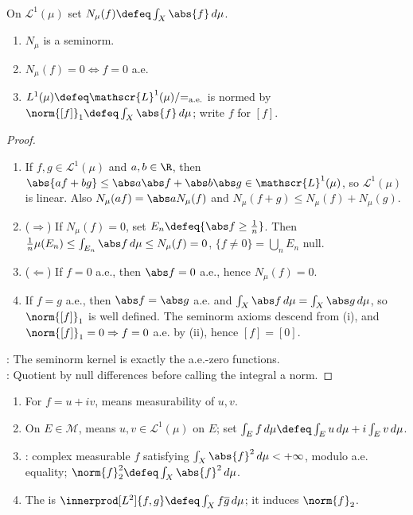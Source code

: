 \begin{proposition} \label{prop:l1-seminorm-and-ae-quotient} \\
On $\mathscr{L}^1(\mu)$ set $N_\mu(f)\defeq\int_X\abs{f}\,d\mu$.
\begin{enumerate}[label=(\roman*)]
\setlength{\itemsep}{0pt}
\item $N_\mu$ is a seminorm.
\item $N_\mu(f)=0\Longleftrightarrow f=0$ a.e.
\item $L^1(\mu)\defeq\mathscr{L}^1(\mu)/{=_{\mathrm{a.e.}}}$ is normed by $\norm{[f]}_1\defeq\int_X\abs{f}\,d\mu$; write $f$ for $[f]$.
\end{enumerate}
\begin{proof}
\begin{enumerate}[label=(\roman*)]
\setlength{\itemsep}{0pt}
\item[$(i)$] If $f,g\in\mathscr{L}^1(\mu)$ and $a,b\in\R$, then $\abs{af+bg}\leq\abs a\abs f+\abs b\abs g\in\mathscr{L}^1(\mu)$, so $\mathscr{L}^1(\mu)$ is linear. Also $N_\mu(af)=\abs aN_\mu(f)$ and $N_\mu(f+g)\leq N_\mu(f)+N_\mu(g)$.
\item[$(ii)$] ($\Rightarrow$) If $N_\mu(f)=0$, set $E_n\defeq\{\abs f\geq\frac{1}{n}\}$. Then $\frac{1}{n}\mu(E_n)\leq\int_{E_n}\abs f\,d\mu\leq N_\mu(f)=0$, $\{f\neq0\}=\bigcup\limits_nE_n$ null. 
\item[$(ii)$] ($\Leftarrow$) If $f=0$ a.e., then $\abs f=0$ a.e., hence $N_\mu(f)=0$.
\item[$(iii)$] If $f=g$ a.e., then $\abs f=\abs g$ a.e. and $\int_X\abs f\,d\mu=\int_X\abs g\,d\mu$, so $\norm{[f]}_1$ is well defined. The seminorm axioms descend from (i), and $\norm{[f]}_1=0\Rightarrow f=0$ a.e. by (ii), hence $[f]=[0]$.
\end{enumerate}
: The seminorm kernel is exactly the a.e.-zero functions.\\
: Quotient by null differences before calling the integral a norm.
\end{proof}
\end{proposition}

\begin{definition} \label{def:complex-integrable-and-l2} 
\begin{enumerate}[label=(\roman*)]
\setlength{\itemsep}{0pt}
\item For $f=u+iv$,  means measurability of $u,v$.
\item On $E\in\mathcal{M}$,  means $u,v\in\mathscr{L}^1(\mu)$ on $E$; set $\int_Ef\,d\mu\defeq\int_Eu\,d\mu+i\int_Ev\,d\mu$.
\item {}: complex measurable $f$ satisfying $\int_X\abs{f}^2\,d\mu<+\infty$, modulo a.e. equality; $\norm{f}_2^2\defeq\int_X\abs{f}^2\,d\mu$.
\item The  is $\innerprod[L^2]{f,g}\defeq\int_Xf\overline{g}\,d\mu$; it induces $\norm{f}_2$.
\end{enumerate}
\end{definition}

